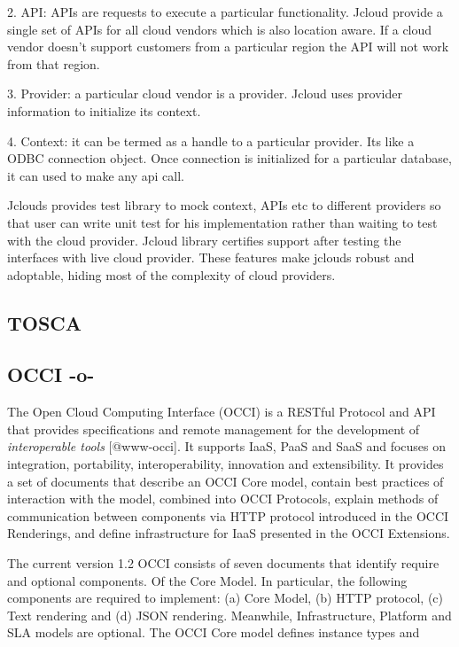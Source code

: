      2. API: APIs are requests to execute a particular
        functionality. Jcloud provide a single set of APIs for all
        cloud vendors which is also location aware. If a cloud vendor
        doesn't support customers from a particular region the API
        will not work from that region.

     3. Provider: a particular cloud vendor is a provider. Jcloud uses
        provider information to initialize its context.

     4. Context: it can be termed as a handle to a particular
        provider. Its like a ODBC connection object. Once connection
        is initialized for a particular database, it can used to make
        any api call.

        Jclouds provides test library to mock context, APIs etc to
        different providers so that user can write unit test for his
        implementation rather than waiting to test with the cloud
        provider. Jcloud library certifies support after testing the
        interfaces with live cloud provider. These features make
        jclouds robust and adoptable, hiding most of the complexity of
        cloud providers.



\subsection{TOSCA}


\subsection{OCCI -o-}

The Open Cloud Computing Interface (OCCI) is a RESTful Protocol and
API that provides specifications and remote management for the
development of \textit{interoperable tools} [@www-occi]. It
supports IaaS, PaaS and SaaS and focuses on integration, portability,
interoperability, innovation and extensibility. It provides a set of
documents that describe an OCCI Core model, contain best practices of
interaction with the model, combined into OCCI Protocols, explain
methods of communication between components via HTTP protocol
introduced in the OCCI Renderings, and define infrastructure for IaaS
presented in the OCCI Extensions.

The current version 1.2 OCCI consists of seven documents that identify
require and optional components. Of the Core Model.  In particular,
the following components are required to implement: (a) Core Model,
(b) HTTP protocol, (c) Text rendering and (d) JSON
rendering. Meanwhile, Infrastructure, Platform and SLA models are
optional.  The OCCI Core model defines instance types and


